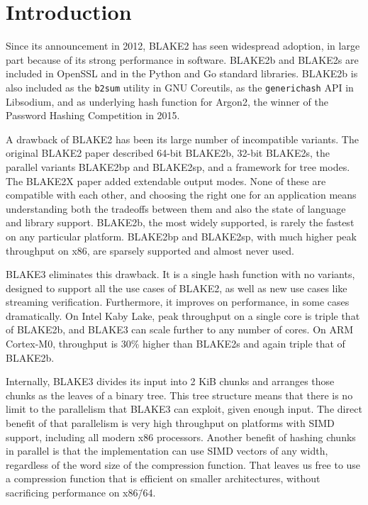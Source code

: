 \documentclass[11pt,notitlepage,a4paper]{article}
\begin{document}
\smallskip

\section{Introduction}\label{sec:intro}

Since its announcement in 2012, BLAKE2 has seen widespread adoption, in large
part because of its strong performance in software. BLAKE2b and BLAKE2s are
included in OpenSSL and in the Python and Go standard libraries. BLAKE2b is
also included as the \texttt{b2sum} utility in GNU Coreutils, as the
\texttt{generichash} API in Libsodium, and as underlying hash function for
Argon2, the winner of the Password Hashing Competition in 2015.

A drawback of BLAKE2 has been its large number of incompatible variants. The
original BLAKE2 paper described 64-bit BLAKE2b, 32-bit BLAKE2s, the parallel
variants BLAKE2bp and BLAKE2sp, and a framework for tree modes. The BLAKE2X
paper added extendable output modes. None of these are compatible with each
other, and choosing the right one for an application means understanding both
the tradeoffs between them and also the state of language and library support.
BLAKE2b, the most widely supported, is rarely the fastest on any particular
platform. BLAKE2bp and BLAKE2sp, with much higher peak throughput on x86, are
sparsely supported and almost never used.

BLAKE3 eliminates this drawback. It is a single hash function with no variants,
designed to support all the use cases of BLAKE2, as well as new use cases like
streaming verification. Furthermore, it improves on performance, in some cases
dramatically. On Intel Kaby Lake, peak throughput on a single core is triple
that of BLAKE2b, and BLAKE3 can scale further to any number of cores. On ARM
Cortex-M0, throughput is 30\% higher than BLAKE2s and again triple that of
BLAKE2b.

Internally, BLAKE3 divides its input into 2 KiB chunks and arranges those
chunks as the leaves of a binary tree. This tree structure means that there is
no limit to the parallelism that BLAKE3 can exploit, given enough input. The
direct benefit of that parallelism is very high throughput on platforms with
SIMD support, including all modern x86 processors. Another benefit of hashing
chunks in parallel is that the implementation can use SIMD vectors of any
width, regardless of the word size of the compression function. That leaves us
free to use a compression function that is efficient on smaller architectures,
without sacrificing performance on x86\=/64.
\end{document}

